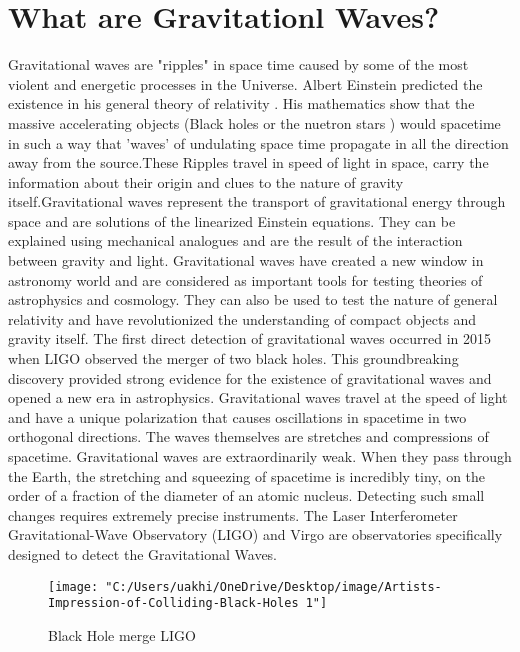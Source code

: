 \section{What are  Gravitationl Waves?}
Gravitational waves are "ripples" in space time caused by some of the most violent and energetic processes in the Universe. Albert Einstein predicted the existence in his general theory of relativity .
His mathematics show that the massive accelerating objects (Black holes or the nuetron stars  ) would spacetime in such a way that 'waves' of undulating space time propagate in all the direction away from the source.These Ripples travel in speed of light in space, carry the information about their origin and clues to the nature of gravity itself.Gravitational waves represent the transport of gravitational energy through space and are solutions 
of the linearized Einstein equations. They can be explained using mechanical analogues and are the result of the 
interaction between gravity and light. Gravitational waves have created a new window in astronomy world and are 
considered as important tools for testing theories of astrophysics and cosmology. They can also be used to test the 
nature of general relativity and have revolutionized the understanding of compact objects and gravity itself.
The first direct detection of gravitational waves occurred in 2015 when LIGO observed the merger of two black holes. 
This groundbreaking discovery provided strong evidence for the existence of gravitational waves and opened a new 
era in astrophysics. Gravitational waves travel at the speed of light and have a unique polarization that causes 
oscillations in spacetime in two orthogonal directions. The waves themselves are stretches and compressions of 
spacetime. Gravitational waves are extraordinarily weak. When they pass through the Earth, the stretching and 
squeezing of spacetime is incredibly tiny, on the order of a fraction of the diameter of an atomic nucleus. Detecting 
such small changes requires extremely precise instruments. The Laser Interferometer Gravitational-Wave Observatory 
(LIGO) and Virgo are observatories specifically designed to detect the  Gravitational Waves.



\begin{figure}
	\centering
	\texttt{[image: "C:/Users/uakhi/OneDrive/Desktop/image/Artists-Impression-of-Colliding-Black-Holes 1"]}
	\caption{Black Hole merge LIGO }
	\label{fig:artists-impression-of-colliding-black-holes-1}
\end{figure}



